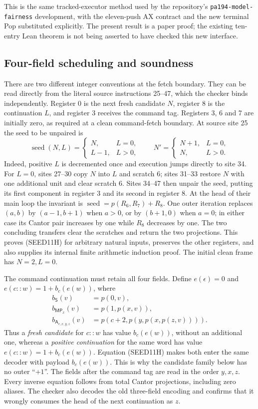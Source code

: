 This is the same tracked-executor method used by the repository's
\texttt{pa194-model-fairness} development, with the eleven-push AX
contract and the new terminal Pop substituted explicitly.  The present
result is a paper proof; the existing ten-entry Lean theorem is not
being asserted to have checked this new interface.

\subsection{Four-field scheduling and soundness}

There are two different integer conventions at the fetch boundary.
They can be read directly from the literal source instructions 25--47,
which the checker binds independently.  Register 0 is the next fresh
candidate $N$, register 8 is the continuation $L$, and register 3
receives the command tag.  Registers 3, 6 and 7 are initially zero,
as required at a clean command-fetch boundary.  At source site 25 the
seed to be unpaired is
\[
 \operatorname{seed}(N,L)=
 \begin{cases}N,&L=0,\\L-1,&L>0,\end{cases}
 \qquad
 N'=\begin{cases}N+1,&L=0,\\N,&L>0.\end{cases}
 \tag{SEED11H}
\]
Indeed, positive $L$ is decremented once and execution jumps directly
to site 34.  For $L=0$, sites 27--30 copy $N$ into $L$ and scratch 6;
sites 31--33 restore $N$ with one additional unit and clear scratch 6.
Sites 34--47 then unpair the seed, putting its first component in
register 3 and its second in register 8.  At the head of their main
loop the invariant is
$\operatorname{seed}=p(R_6,R_7)+R_8$.  One outer iteration replaces
$(a,b)$ by $(a-1,b+1)$ when $a>0$, or by $(b+1,0)$ when $a=0$;
in either case its Cantor pair increases by one while $R_8$ decreases
by one.  The two concluding transfers clear the scratches and return
the two projections.  This proves (SEED11H) for arbitrary natural
inputs, preserves the other registers, and also supplies its internal
finite arithmetic induction proof.  The initial clean frame has
$N=2,L=0$.

The command continuation must retain all four fields.  Define
$e(\epsilon)=0$ and $e(c::w)=1+b_c(e(w))$, where
\begin{align*}
 b_{\mathsf S}(v)&=p(0,v),\\
 b_{\mathsf{MP}_x}(v)&=p(1,p(x,v)),\\
 b_{\mathsf A_{c,x,y,z}}(v)&=p(c+2,p(y,p(x,p(z,v)))).
\end{align*}
Thus a \emph{fresh candidate} for $c::w$ has value $b_c(e(w))$,
without an additional one, whereas a \emph{positive continuation}
for the same word has value $e(c::w)=1+b_c(e(w))$.
Equation (SEED11H) makes both enter the same decoder with payload
$b_c(e(w))$.  This is why the candidate family below has no outer
``$+1$''.  The fields after the command tag are read in the order $y,x,z$.
Every inverse equation follows from total Cantor projections, including
zero aliases.  The checker also decodes the old three-field encoding
and confirms that it wrongly consumes the head of the next continuation
as $z$.

